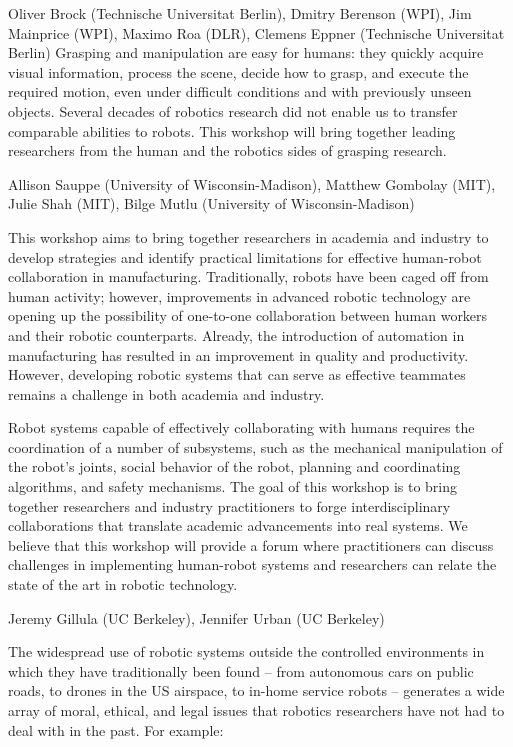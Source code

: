 \begin{spacing}{1.0}
\clearpage 

{Oliver Brock (Technische Universitat Berlin), Dmitry Berenson (WPI), Jim Mainprice (WPI), Maximo Roa (DLR), Clemens Eppner (Technische Universitat Berlin)}
{
Grasping and manipulation are easy for humans: they quickly acquire visual information, process the scene, decide how to grasp, and execute the required motion, even under difficult conditions and with previously unseen objects. Several decades of robotics research did not enable us to transfer comparable abilities to robots. This workshop will bring together leading researchers from the human and the robotics sides of grasping research.
}


%
{Allison Sauppe (University of Wisconsin-Madison), Matthew Gombolay (MIT), Julie Shah (MIT), Bilge Mutlu (University of Wisconsin-Madison)}
{
This workshop aims to bring together researchers in academia and industry to develop strategies and identify practical limitations for effective human-robot collaboration in manufacturing. Traditionally, robots have been caged off from human activity; however, improvements in advanced robotic technology are opening up the possibility of one-to-one collaboration between human workers and their robotic counterparts. Already, the introduction of automation in manufacturing has resulted in an improvement in quality and productivity. However, developing robotic systems that can serve as effective teammates remains a challenge in both academia and industry.

Robot systems capable of effectively collaborating with humans requires the coordination of a number of subsystems, such as the mechanical manipulation of the robot’s joints, social behavior of the robot, planning and coordinating algorithms, and safety mechanisms. The goal of this workshop is to bring together researchers and industry practitioners to forge interdisciplinary collaborations that translate academic advancements into real systems. We believe that this workshop will provide a forum where practitioners can discuss challenges in implementing human-robot systems and researchers can relate the state of the art in robotic technology.
}

%
{Jeremy Gillula (UC Berkeley), Jennifer Urban (UC Berkeley)}
{
The widespread use of robotic systems outside the controlled environments in which they have traditionally been found – from autonomous cars on public roads, to drones in the US airspace, to in-home service robots – generates a wide array of moral, ethical, and legal issues that robotics researchers have not had to deal with in the past. For example:

}
\end{spacing}
